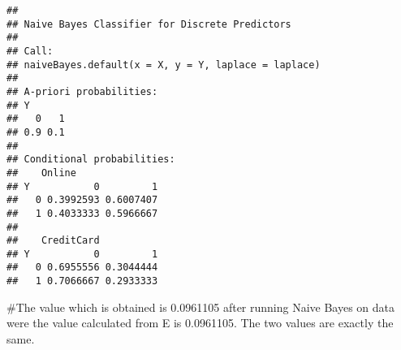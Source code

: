 \documentclass[
]{article}
\begin{document}
\begin{verbatim}
## 
## Naive Bayes Classifier for Discrete Predictors
## 
## Call:
## naiveBayes.default(x = X, y = Y, laplace = laplace)
## 
## A-priori probabilities:
## Y
##   0   1 
## 0.9 0.1 
## 
## Conditional probabilities:
##    Online
## Y           0         1
##   0 0.3992593 0.6007407
##   1 0.4033333 0.5966667
## 
##    CreditCard
## Y           0         1
##   0 0.6955556 0.3044444
##   1 0.7066667 0.2933333
\end{verbatim}

\#The value which is obtained is 0.0961105 after running Naive Bayes on
data were the value calculated from E is 0.0961105. The two values are
exactly the same.
\end{document}
